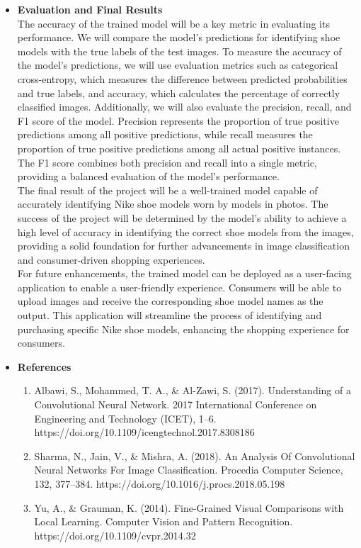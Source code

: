 \documentclass{article}
\begin{document}
\begin{itemize}
            \item[] \textbf{Evaluation and Final Results} \\
		The accuracy of the trained model will be a key metric in evaluating its performance. We will compare the model's predictions for identifying shoe models with the true labels of the test images. To measure the accuracy of the model's predictions, we will use evaluation metrics such as categorical cross-entropy, which measures the difference between predicted probabilities and true labels, and accuracy, which calculates the percentage of correctly classified images. Additionally, we will also evaluate the precision, recall, and F1 score of the model. Precision represents the proportion of true positive predictions among all positive predictions, while recall measures the proportion of true positive predictions among all actual positive instances. The F1 score combines both precision and recall into a single metric, providing a balanced evaluation of the model's performance. \\

  
  

The final result of the project will be a well-trained model capable of accurately identifying Nike shoe models worn by models in photos. The success of the project will be determined by the model's ability to achieve a high level of accuracy in identifying the correct shoe models from the images, providing a solid foundation for further advancements in image classification and consumer-driven shopping experiences. \\

  
  

For future enhancements, the trained model can be deployed as a user-facing application to enable a user-friendly experience. Consumers will be able to upload images and receive the corresponding shoe model names as the output. This application will streamline the process of identifying and purchasing specific Nike shoe models, enhancing the shopping experience for consumers. 
‌             \item[] \textbf{References} 
		\begin{enumerate}
		\item Albawi, S., Mohammed, T. A., \& Al-Zawi, S. (2017). Understanding of a Convolutional Neural Network. 2017 International Conference on Engineering and Technology (ICET), 1–6. https://doi.org/10.1109/icengtechnol.2017.8308186  
		\item Sharma, N., Jain, V., \& Mishra, A. (2018). An Analysis Of Convolutional Neural Networks For Image Classification. Procedia Computer Science, 132, 377–384. https://doi.org/10.1016/j.procs.2018.05.198
		\item Yu, A., \& Grauman, K. (2014). Fine-Grained Visual Comparisons with Local Learning. Computer Vision and Pattern Recognition. https://doi.org/10.1109/cvpr.2014.32 
		\end{enumerate}
        \end{itemize}
\end{document}
